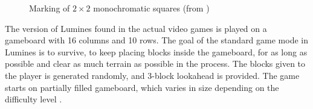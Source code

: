 \begin{figure}[H]
    \centering
    \caption{Marking of $2 \times 2$ monochromatic squares (from \cite{lumines})}
\end{figure}

The version of Lumines found in the actual video games is played on a gameboard with 16 columns and 10 rows. The goal of the standard game mode in Lumines is to survive, to keep placing blocks inside the gameboard, for as long as possible and clear as much terrain as possible in the process. The blocks given to the player is generated randomly, and 3-block lookahead is provided. The game starts on partially filled gameboard, which varies in size depending on the difficulty level \cite{lumines}.

